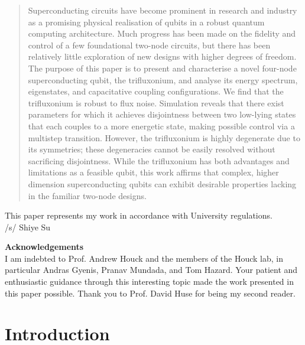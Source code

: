 \documentclass[11pt]{article}
\begin{document}
\begin{titlepage}
\begin{abstract}
\normalsize
Superconducting circuits have become prominent in research and industry as a promising physical realisation of qubits in a robust quantum computing architecture. Much progress has been made on the fidelity and control of a few foundational two-node circuits, but there has been relatively little exploration of new designs with higher degrees of freedom. The purpose of this paper is to present and characterise a novel four-node superconducting qubit, the trifluxonium, and analyse its energy spectrum, eigenstates, and capacitative coupling configurations. We find that the trifluxonium is robust to flux noise. Simulation reveals that there exist parameters for which it achieves disjointness between two low-lying states that each couples to a more energetic state, making possible control via a multistep transition. However, the trifluxonium is highly degenerate due to its symmetries; these degeneracies cannot be easily resolved without sacrificing disjointness. While the trifluxonium has both advantages and limitations as a feasible qubit, this work affirms that complex, higher dimension superconducting qubits can exhibit desirable properties lacking in the familiar two-node designs.
\end{abstract}


\vspace*{2cm}
\normalsize{This paper represents my work in accordance with University regulations.} \\
\normalsize{/s/ Shiye Su}

\vfill

\end{titlepage}


\newpage
\tableofcontents


\vspace{2cm}

\begin{centering}
\textbf{\Large Acknowledgements}
\\
\vspace{0.5cm}
I am indebted to Prof. Andrew Houck and the members of the Houck lab, in particular Andras Gyenis, Pranav Mundada, and Tom Hazard. Your patient and enthusiastic guidance through this interesting topic made the work presented in this paper possible. Thank you to Prof. David Huse for being my second reader.
\end{centering}


\newpage

\section{Introduction}
\end{document}
